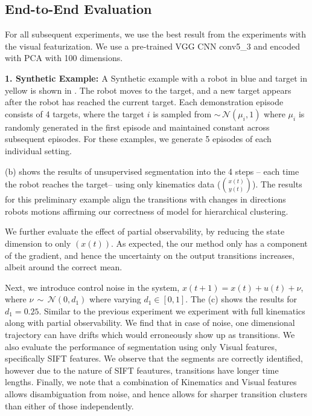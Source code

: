 \documentclass[0-main.tex]{subfiles}
\begin{document}
\subsection{End-to-End Evaluation}
For all subsequent experiments, we use the best result from the experiments with the visual featurization. We use a pre-trained VGG CNN conv5\_3 and encoded with PCA with 100 dimensions. 

\vspace{5pt}
\noindent \textbf{1. Synthetic Example: \label{sec:syn}}
A Synthetic example with a robot in blue and target in yellow is shown in . The robot moves to the target, and a new target appears after the robot has reached the current target. Each demonstration episode consists of 4 targets, where the target $i$ is sampled from  $\sim\,\mathcal{N}(\mu_i, 1)$ where $\mu_i$ is randomly generated in the first episode and maintained constant across subsequent episodes. For these examples, we generate 5 episodes of each individual setting.

 (b) shows the results of unsupervised segmentation into the 4 steps -- each time the robot reaches the target-- using only kinematics data ($\binom{x(t)}{y(t)}$). The results for this preliminary example align the transitions with changes in directions robots motions affirming our correctness of model for hierarchical clustering. 

We further evaluate the effect of partial observability, by reducing the state dimension to only $(x(t))$. As expected, the our method only has a component of the gradient, and hence the uncertainty on the output transitions increases, albeit around the correct mean. 

Next, we introduce control noise in the system, $x(t+1) = x(t)+u(t)+\nu$, where $\nu\, \sim\, \mathcal{N}(0, d_1)$ where varying $d_1\in[0,1]$. The  (c) shows the results for $d_1=0.25$. Similar to the previous experiment we experiment with full kinematics along with partial observability. We find that in case of noise, one dimensional trajectory can have drifts which would erroneously show up as transitions. 
We also evaluate the performance of segmentation using only Visual features, specifically SIFT features. We observe that the segments are correctly identified, however due to the nature of SIFT feautures, transitions have longer time lengths.
Finally, we note that a combination of Kinematics and Visual features allows disambiguation from noise, and hence allows for sharper transition clusters than either of those independently. 
\end{document}
